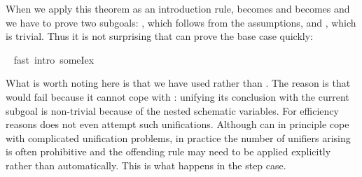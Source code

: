 \begin{isabellebody}
\begin{isamarkuptxt}
\begin{isabelle}
\end{isabelle}
When we apply this theorem as an introduction rule,  becomes
 and  becomes  and we have to prove
two subgoals: , which follows from the assumptions, and
, which is trivial. Thus it is not surprising that
 can prove the base case quickly:%
\end{isamarkuptxt}%
\ \isamarkuptrue%
fast\ intro{\isacharcolon}\ someI{}{\isacharunderscore}ex{\isacharparenright}\isamarkupfalse%
%
\begin{isamarkuptxt}%
\noindent
What is worth noting here is that we have used  rather than
.  The reason is that  would fail because it cannot
cope with : unifying its conclusion with the current
subgoal is non-trivial because of the nested schematic variables. For
efficiency reasons  does not even attempt such unifications.
Although  can in principle cope with complicated unification
problems, in practice the number of unifiers arising is often prohibitive and
the offending rule may need to be applied explicitly rather than
automatically. This is what happens in the step case.


\end{isamarkuptxt}
\end{isabellebody}
